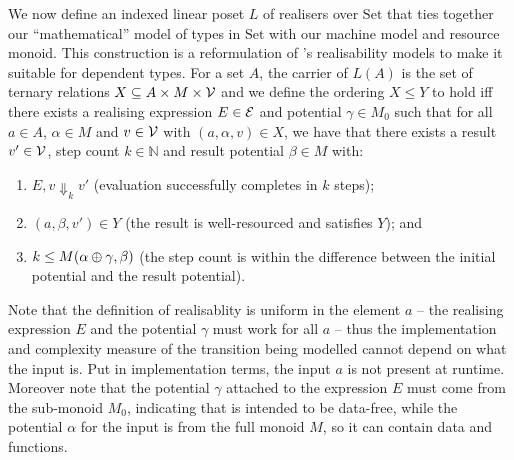 \documentclass[acmsmall,screen]{acmart}
\newcommand{\Set}{\mathrm{Set}}
\begin{document}
We now define an indexed linear poset $L$ of realisers over $\Set$
that ties together our ``mathematical'' model of types in $\Set$ with
our machine model and resource monoid. This construction is a
reformulation of \citet{dallago11realisability}'s realisability models
to make it suitable for dependent types. For a set $A$, the carrier of
$L(A)$ is the set of ternary relations
$X \subseteq A \times M \times \mathcal{V}$ and we define the ordering
$X \leq Y$ to hold iff there exists a realising expression
$E \in \mathcal{E}$ and potential $\gamma \in M_0$ such that for all
$a \in A$, $\alpha \in M$ and $v \in \mathcal{V}$ with
$(a,\alpha,v) \in X$, we have that there exists a result
$v' \in \mathcal{V}$, step count $k \in \mathbb{N}$ and result potential
$\beta \in M$ with:
\begin{enumerate}
\item $E, v \Downarrow_k v'$ (evaluation successfully completes in $k$ steps);
\item $(a, \beta, v') \in Y$ (the result is well-resourced and
  satisfies $Y$); and
\item $k \leq M(\alpha \oplus \gamma, \beta)$ (the step count is within the
  difference between the initial potential and the result potential).
\end{enumerate}
Note that the definition of realisablity is uniform in the element $a$
-- the realising expression $E$ and the potential $\gamma$ must work
for all $a$ -- thus the implementation and complexity measure of the
transition being modelled cannot depend on what the input is. Put in
implementation terms, the input $a$ is not present at
runtime. Moreover note that the potential $\gamma$ attached to the
expression $E$ must come from the sub-monoid $M_0$, indicating that is
intended to be data-free, while the potential $\alpha$ for the input
is from the full monoid $M$, so it can contain data and functions.
\end{document}

